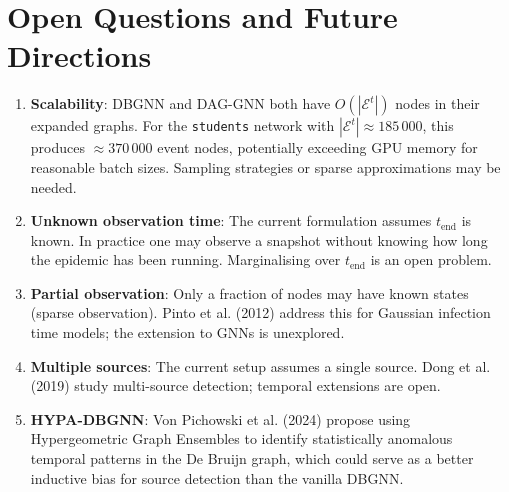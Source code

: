 \documentclass[12pt,a4paper]{report}
\newcommand{\calE}{\mathcal{E}}
\begin{document}
\section{Open Questions and Future Directions}

\begin{enumerate}
  \item \textbf{Scalability}: DBGNN and DAG-GNN both have $O(|\calE^t|)$ nodes
    in their expanded graphs. For the \texttt{students} network with
    $|\calE^t| \approx 185\,000$, this produces $\approx 370\,000$ event nodes,
    potentially exceeding GPU memory for reasonable batch sizes. Sampling
    strategies or sparse approximations may be needed.
  \item \textbf{Unknown observation time}: The current formulation assumes
    $t_{\text{end}}$ is known. In practice one may observe a snapshot without
    knowing how long the epidemic has been running. Marginalising over $t_{\text{end}}$
    is an open problem.
  \item \textbf{Partial observation}: Only a fraction of nodes may have known
    states (sparse observation). Pinto et al. (2012) address this for Gaussian
    infection time models; the extension to GNNs is unexplored.
  \item \textbf{Multiple sources}: The current setup assumes a single source.
    Dong et al. (2019) study multi-source detection; temporal extensions are
    open.
  \item \textbf{HYPA-DBGNN}: Von Pichowski et al. (2024) propose using
    Hypergeometric Graph Ensembles to identify statistically anomalous temporal
    patterns in the De Bruijn graph, which could serve as a better inductive
    bias for source detection than the vanilla DBGNN.
\end{enumerate}
\end{document}
